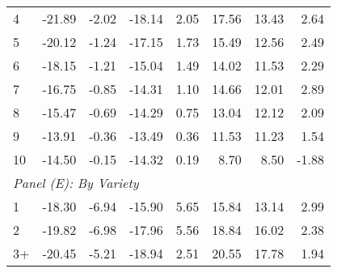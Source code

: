 \begin{table}
\begin{tabular}{lrrrrrrr}
	4       &          -21.89 &      -2.02 &         -18.14 &      2.05 &            17.56 &          13.43 &  2.64 \\
	5       &          -20.12 &      -1.24 &         -17.15 &      1.73 &            15.49 &          12.56 &  2.49 \\
	6       &          -18.15 &      -1.21 &         -15.04 &      1.49 &            14.02 &          11.53 &  2.29 \\
	7       &          -16.75 &      -0.85 &         -14.31 &      1.10 &            14.66 &          12.01 &  2.89 \\
	8       &          -15.47 &      -0.69 &         -14.29 &      0.75 &            13.04 &          12.12 &  2.09 \\
	9       &          -13.91 &      -0.36 &         -13.49 &      0.36 &            11.53 &          11.23 &  1.54 \\
	10      &          -14.50 &      -0.15 &         -14.32 &      0.19 &             8.70 &           8.50 & -1.88 \\ \hline
	\multicolumn{8}{l}{\textit{Panel (E): By Variety}}                                                              \\ \hline
	1       &          -18.30 &      -6.94 &         -15.90 &      5.65 &            15.84 &          13.14 &  2.99 \\
	2       &          -19.82 &      -6.98 &         -17.96 &      5.56 &            18.84 &          16.02 &  2.38 \\
	3+      &          -20.45 &      -5.21 &         -18.94 &      2.51 &            20.55 &          17.78 &  1.94 \\ \hline\hline
\end{tabular}
\end{table}
